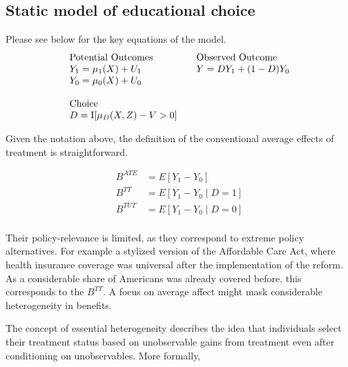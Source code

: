 \FloatBarrier\subsection{Static model of educational choice}

\begin{boenumerate}
\item Please see below for the key equations of the model.
\begin{align*}\begin{array}{l@{\qquad}l}
        \text{Potential Outcomes} &\text{Observed Outcome}\\
        Y_1 = \mu_1(X) + U_1      &  Y = D Y_1 + (1 - D)Y_0 \\
        Y_0 = \mu_0(X) + U_0      &\\
        & \\
        \text{Choice} & \\
        D = \mathrm{I}[\mu_D(X, Z) - V > 0] & \\
    \end{array}
\end{align*}

\item Given the notation above, the definition of the conventional average effects of treatment is straightforward.

\begin{align*}
    B^{ATE} & = E[Y_1 - Y_0 ]\\
    B^{TT} & = E[Y_1 - Y_0 \mid D = 1]\\
    B^{TUT} & = E[Y_1 - Y_0 \mid D = 0]\\
\end{align*}

Their policy-relevance is limited, as they correspond to extreme policy alternatives. For example a stylized version of the Affordable Care Act, where health insurance coverage was universal after the implementation of the reform. As a considerable share of Americans was already covered before, this corresponds to the $B^{TT}$. A focus on average affect might mask considerable heterogeneity in benefits.

\item The concept of essential heterogeneity describes the idea that individuals select their treatment status based on unobservable gains from treatment even after conditioning on unobservables. More formally,


\end{boenumerate}
